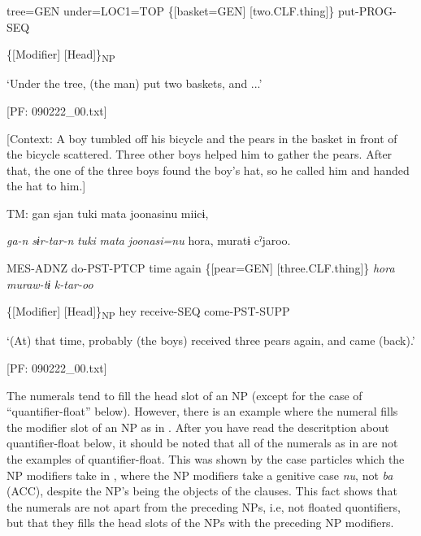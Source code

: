      tree=GEN  under=LOC1=TOP  \{[basket=GEN]  [two.CLF.thing]\}   put-PROG-SEQ
                                                                              
          \{[Modifier]  [Head]\}\textsubscript{NP}

      ‘Under the tree, (the man) put two baskets, and ...’

      [PF: 090222\_00.txt]

\ex \label{ex:7:12c}[Context: A boy tumbled off his bicycle and the pears in the basket in front of the bicycle scattered. Three other boys helped him to gather the pears. After that, the one of the three boys found the boy’s hat, so he called him and handed the hat to him.]

    TM:  gan  sjan  tuki  mata  joonasinu  miicɨ,

      \textit{ga-n}  \textit{sɨr-tar-n}  \textit{tuki}  \textit{mata}  \textit{joonasi=nu}  \textit{} {\textbar}hora{\textbar},  muratɨ  cˀjaroo.
                                                                                                          
      MES-ADNZ  do-PST-PTCP  time  again  \{[pear=GEN]  [three.CLF.thing]\}    \textit{hora}  \textit{muraw-tɨ}  \textit{k-tar-oo}
                                                                                                          
              \{[Modifier]  [Head]\}\textsubscript{NP}    hey  receive-SEQ  come-PST-SUPP

      ‘(At) that time, probably (the boys) received three pears again, and came (back).’

      [PF: 090222\_00.txt]
    \z
\z

The numerals tend to fill the head slot of an NP (except for the case of “quantifier-float” below). However, there is an example where the numeral fills the modifier slot of an NP as in . After you have read the descritption about quantifier-float below, it should be noted that all of the numerals as in  are not the examples of quantifier-float. This was shown by the case particles which the NP modifiers take in , where the NP modifiers take a genitive case \textit{nu}, not \textit{ba} (ACC), despite the NP’s being the objects of the clauses. This fact shows that the numerals are not apart from the preceding NPs, i.e, not floated quontifiers, but that they fills the head slots of the NPs with the preceding NP modifiers.

